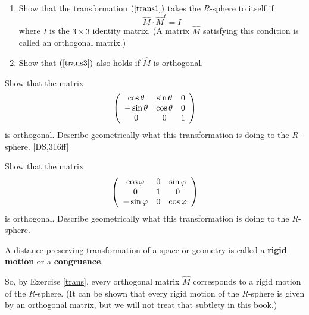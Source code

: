 \documentclass{ximera}
\begin{document}
\begin{exercise}\hfil
\label{trans} 
\begin{enumerate}
\item Show that the transformation $\left(
\ref{trans1}\right)  $ takes the $R$-sphere to itself if%
\[
\hat{M}\cdot\hat{M}^{t}=I
\]
where $I$ is the $3\times3$ identity matrix. (A matrix $\hat{M}$ satisfying
this condition is called an orthogonal matrix.)

\item Show that $\left(  \ref{trans3}\right)  $ also holds if $\hat{M}$ is orthogonal.
\end{enumerate}
\end{exercise}

\begin{exercise}
 Show that the matrix%
\[
\left(
\begin{array}
[c]{ccc}%
\cos \theta & \sin \theta & 0\\
-\sin \theta & \cos \theta & 0\\
0 & 0 & 1
\end{array}
\right)
\]
is orthogonal. Describe geometrically what this transformation is doing to the
$R$-sphere. [DS,316ff]
\end{exercise}

\begin{exercise}
 Show that the matrix%
\[
\left(
\begin{array}
[c]{ccc}%
\cos \varphi & 0 & \sin \varphi\\
0 & 1 & 0\\
-\sin \varphi & 0 & \cos \varphi
\end{array}
\right)
\]
is orthogonal. Describe geometrically what this transformation is doing to the
$R$-sphere.
\end{exercise}

\begin{definition}
A distance-preserving transformation of a space or geometry is called a
\textbf{rigid motion} or a \textbf{congruence}.
\end{definition}

So, by Exercise \ref{trans}, every orthogonal matrix $\hat{M}$ corresponds to
a rigid motion of the $R$-sphere. (It can be shown that every rigid motion of
the $R$-sphere is given by an orthogonal matrix, but we will not treat that
subtlety in this book.)
\end{document}
